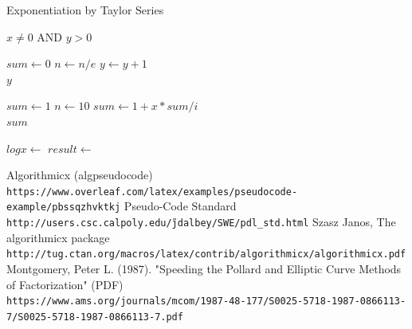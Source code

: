 \documentclass[a4paper, 11pt]{report}
\begin{document}
\begin{algorithm}
\caption{Exponentiation by Taylor Series}\label{exp1}
\begin{algorithmic}[1]
\Require $x \neq 0$ AND $y > 0$

\State $sum\gets 0$
    \State $n\gets n/e$
    \State $y \gets y+1 $
\EndWhile \\
\Return $y$
\EndFunction

\State $sum\gets 1$
\State $n\gets 10$
\State $sum\gets 1+ x * sum / i$
\EndFor \\
\Return $sum$
\EndFunction

\State $logx \gets $
\State $result \gets $
\end{algorithmic}
\end{algorithm}

\begin{thebibliography}{}
Algorithmicx (algpseudocode)
\\\texttt{https://www.overleaf.com/latex/examples/pseudocode-example/pbssqzhvktkj}
Pseudo-Code Standard
\\\texttt{http://users.csc.calpoly.edu/\~jdalbey/SWE/pdl\_std.html}
Szasz Janos, The algorithmicx package
\\\texttt{http://tug.ctan.org/macros/latex/contrib/algorithmicx/algorithmicx.pdf}
 Montgomery, Peter L. (1987). "Speeding the Pollard and Elliptic Curve Methods of Factorization" (PDF)
\\\texttt{https://www.ams.org/journals/mcom/1987-48-177/S0025-5718-1987-0866113-7/S0025-5718-1987-0866113-7.pdf}
\end{thebibliography}
\end{document}
